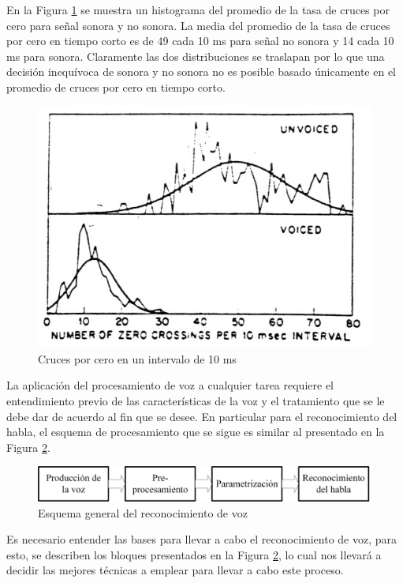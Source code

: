 En la Figura \ref{fig:gaussianHisto} se muestra un histograma del promedio de la tasa de cruces por cero para señal sonora y no sonora. La media del promedio de la tasa de cruces por cero en tiempo corto es de 49 cada 10 ms para señal no sonora y 14 cada 10 ms para sonora. Claramente las dos distribuciones se traslapan por lo que una decisión inequívoca de sonora y no sonora no es posible basado únicamente en el promedio de cruces por cero en tiempo corto.

\begin{figure}[H]
	\centering
	\includegraphics[width=0.6\linewidth]{figures/gaussianHisto}
	\caption{Cruces por cero en un intervalo de 10 ms}
	\label{fig:gaussianHisto}
\end{figure}

La aplicación del procesamiento de voz a cualquier tarea requiere el entendimiento previo de las características de la voz y el tratamiento que se le debe dar de acuerdo al fin que se desee. En particular para el reconocimiento del habla, el esquema de procesamiento que se sigue es similar al presentado en la Figura \ref{fig:esquemaReconocimiento}.

\begin{figure}[H]
	\centering
	\includegraphics[width=0.8\linewidth]{figures/esquemaReconocimiento}
	\caption{Esquema general del reconocimiento de voz}
	\label{fig:esquemaReconocimiento}
\end{figure}

Es necesario entender las bases para llevar a cabo el reconocimiento de voz, para esto, se describen los bloques presentados en la Figura \ref{fig:esquemaReconocimiento}, lo cual nos llevará a decidir las mejores técnicas a emplear para llevar a cabo este proceso. \cite{SalcedoCherubini2006}


